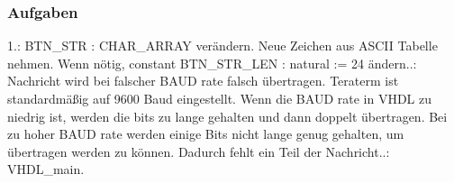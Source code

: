 \documentclass{article}
\begin{document}
\subsubsection{Aufgaben}
1.:\newline
BTN\_STR : CHAR\_ARRAY ver\"andern. Neue Zeichen aus ASCII Tabelle nehmen.\newline
Wenn n\"otig, constant BTN\_STR\_LEN : natural := 24 \"andern..:\newline
Nachricht wird bei falscher BAUD rate falsch \"ubertragen. Teraterm ist standardm\"a{\ss}ig auf 9600 Baud eingestellt. Wenn die BAUD rate in VHDL zu niedrig ist, werden die bits zu lange gehalten und dann doppelt \"ubertragen. Bei zu hoher BAUD rate werden einige Bits nicht lange genug gehalten, um \"ubertragen werden zu k\"onnen. Dadurch fehlt ein Teil der Nachricht..:\newline
VHDL\_main.\newline
\end{document}

